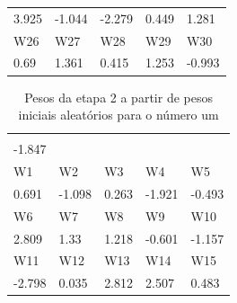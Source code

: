 \documentclass[11pt]{article}
\begin{document}
\begin{table}[h]
\begin{tabular}{lllll}
  3.925                                             & -1.044                     & -2.279                     & 0.449                      & 1.281                      \\
  \rowcolor[HTML]{000000}
  {\color[HTML]{FFFFFF} W26}                        & {\color[HTML]{FFFFFF} W27} & {\color[HTML]{FFFFFF} W28} & {\color[HTML]{FFFFFF} W29} & {\color[HTML]{FFFFFF} W30} \\
  0.69                                              & 1.361                      & 0.415                      & 1.253                      & -0.993
  \end{tabular}
\end{table}

\begin{table}[h]
  \centering
  \caption{Pesos da etapa 2 a partir de pesos iniciais aleatórios para o número um}
  \label{tab:wp1r_2}
  \begin{tabular}{lllll}
  \cellcolor[HTML]{000000}{\color[HTML]{FFFFFF} W0} &                            &                            &                            &                            \\
  -1.847                                            &                            &                            &                            &                            \\
  \rowcolor[HTML]{000000}
  {\color[HTML]{FFFFFF} W1}                         & {\color[HTML]{FFFFFF} W2}  & {\color[HTML]{FFFFFF} W3}  & {\color[HTML]{FFFFFF} W4}  & {\color[HTML]{FFFFFF} W5}  \\
  0.691                                             & -1.098                     & 0.263                      & -1.921                     & -0.493                     \\
  \rowcolor[HTML]{000000}
  {\color[HTML]{FFFFFF} W6}                         & {\color[HTML]{FFFFFF} W7}  & {\color[HTML]{FFFFFF} W8}  & {\color[HTML]{FFFFFF} W9}  & {\color[HTML]{FFFFFF} W10} \\
  2.809                                             & 1.33                       & 1.218                      & -0.601                     & -1.157                     \\
  \rowcolor[HTML]{000000}
  {\color[HTML]{FFFFFF} W11}                        & {\color[HTML]{FFFFFF} W12} & {\color[HTML]{FFFFFF} W13} & {\color[HTML]{FFFFFF} W14} & {\color[HTML]{FFFFFF} W15} \\
  -2.798                                            & 0.035                      & 2.812                      & 2.507                      & 0.483                      \\

\end{tabular}
\end{table}
\end{document}
